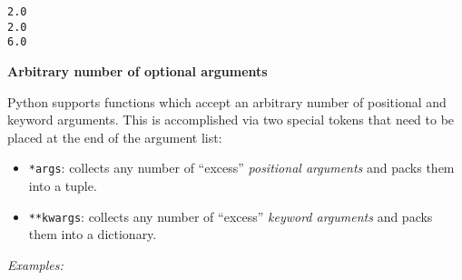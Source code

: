 \documentclass[10pt]{scrartcl}
\providecommand{\tightlist}{%
      \setlength{\itemsep}{0pt}\setlength{\parskip}{0pt}}
\begin{document}
    \begin{Verbatim}[commandchars=\\\{\}]
2.0
2.0
6.0
    \end{Verbatim}

    \textbf{Arbitrary number of optional arguments}

Python supports functions which accept an arbitrary number of positional
and keyword arguments. This is accomplished via two special tokens that
need to be placed at the end of the argument list:

\begin{itemize}
\tightlist
\item
  \texttt{*args}: collects any number of ``excess'' \emph{positional
  arguments} and packs them into a tuple.
\item
  \texttt{**kwargs}: collects any number of ``excess'' \emph{keyword
  arguments} and packs them into a dictionary.
\end{itemize}

\emph{Examples:}
\end{document}
